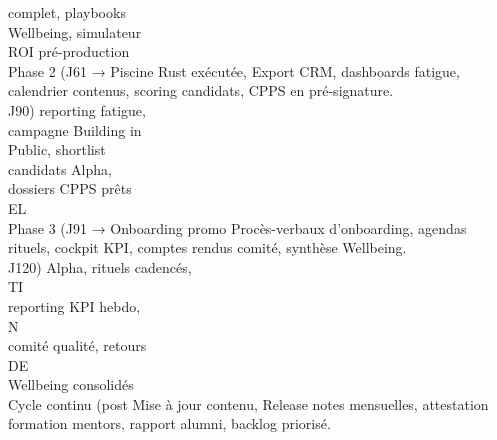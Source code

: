 \documentclass[12pt,landscape,a4paper]{article}
\begin{document}
complet, playbooks\\
Wellbeing, simulateur\\
ROI pré-production\\
Phase 2 (J61 →        Piscine Rust exécutée,     Export CRM, dashboards fatigue, calendrier contenus, scoring candidats, CPPS en pré-signature.\\
J90)                  reporting fatigue,\\
campagne Building in\\
Public, shortlist\\
candidats Alpha,\\
dossiers CPPS prêts\\
\vspace{0.5em}
\vspace{0.5em}
\vspace{0.5em}
\vspace{0.5em}
EL\\
Phase 3 (J91 →        Onboarding promo           Procès-verbaux d’onboarding, agendas rituels, cockpit KPI, comptes rendus comité, synthèse Wellbeing.\\
J120)                 Alpha, rituels cadencés,\\
\vspace{0.5em}
\vspace{0.5em}
\vspace{0.5em}
\vspace{0.5em}
TI\\
reporting KPI hebdo,\\
\vspace{0.5em}
\vspace{0.5em}
\vspace{0.5em}
\vspace{0.5em}
N\\
comité qualité, retours\\
\vspace{0.5em}
\vspace{0.5em}
\vspace{0.5em}
\vspace{0.5em}
DE\\
Wellbeing consolidés\\
Cycle continu (post   Mise à jour contenu,       Release notes mensuelles, attestation formation mentors, rapport alumni, backlog priorisé.\\
\vspace{0.5em}
\vspace{0.5em}
\vspace{0.5em}
\vspace{0.5em}
\end{document}
